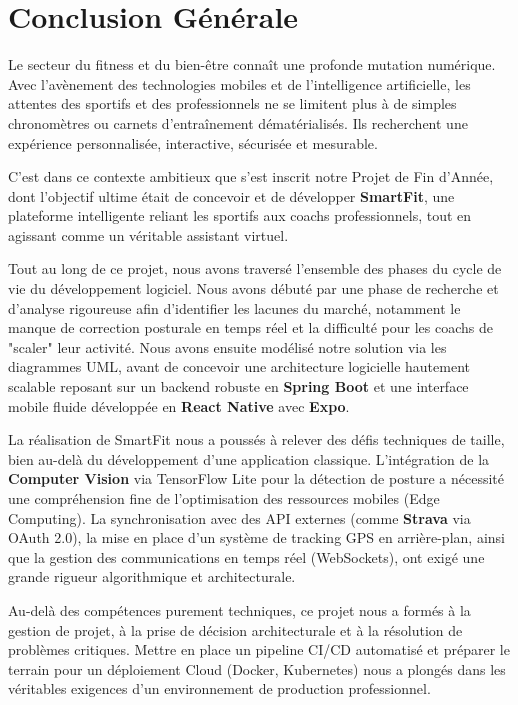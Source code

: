 \chapter*{Conclusion Générale}

Le secteur du fitness et du bien-être connaît une profonde mutation numérique. Avec l'avènement des technologies mobiles et de l'intelligence artificielle, les attentes des sportifs et des professionnels ne se limitent plus à de simples chronomètres ou carnets d'entraînement dématérialisés. Ils recherchent une expérience personnalisée, interactive, sécurisée et mesurable.

C'est dans ce contexte ambitieux que s'est inscrit notre Projet de Fin d'Année, dont l'objectif ultime était de concevoir et de développer \textbf{SmartFit}, une plateforme intelligente reliant les sportifs aux coachs professionnels, tout en agissant comme un véritable assistant virtuel. 

Tout au long de ce projet, nous avons traversé l'ensemble des phases du cycle de vie du développement logiciel. Nous avons débuté par une phase de recherche et d'analyse rigoureuse afin d'identifier les lacunes du marché, notamment le manque de correction posturale en temps réel et la difficulté pour les coachs de "scaler" leur activité. Nous avons ensuite modélisé notre solution via les diagrammes UML, avant de concevoir une architecture logicielle hautement scalable reposant sur un backend robuste en \textbf{Spring Boot} et une interface mobile fluide développée en \textbf{React Native} avec \textbf{Expo}.

La réalisation de SmartFit nous a poussés à relever des défis techniques de taille, bien au-delà du développement d'une application classique. L'intégration de la \textbf{Computer Vision} via TensorFlow Lite pour la détection de posture a nécessité une compréhension fine de l'optimisation des ressources mobiles (Edge Computing). La synchronisation avec des API externes (comme \textbf{Strava} via OAuth 2.0), la mise en place d'un système de tracking GPS en arrière-plan, ainsi que la gestion des communications en temps réel (WebSockets), ont exigé une grande rigueur algorithmique et architecturale.

Au-delà des compétences purement techniques, ce projet nous a formés à la gestion de projet, à la prise de décision architecturale et à la résolution de problèmes critiques. Mettre en place un pipeline CI/CD automatisé et préparer le terrain pour un déploiement Cloud (Docker, Kubernetes) nous a plongés dans les véritables exigences d'un environnement de production professionnel.

